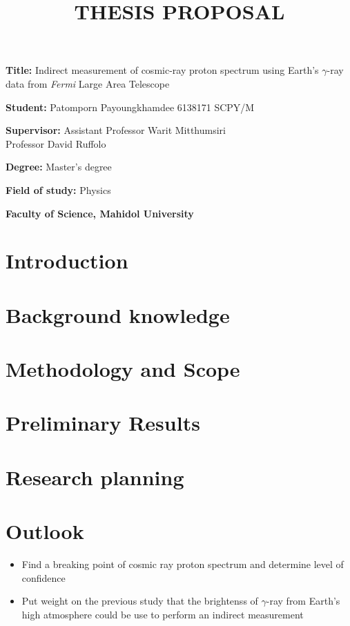 \documentclass[12pt, a4paper]{article}
\title{THESIS PROPOSAL}
\author{}
\date{}
\newcommand{\namelistlabel}[1]{\mbox{#1}\hfil}
\newenvironment{namelist}[1]{%
\begin{list}{}
    {
        \let\makelabel\namelistlabel
        \settowidth{\labelwidth}{#1}
        \setlength{\leftmargin}{1.1\labelwidth}
    }
  }{%
\end{list}}
\begin{document}
\maketitle

\begin{namelist}{xxxxxxxxxxxx}
\item[{\bf Title:}]
Indirect measurement of cosmic-ray proton spectrum using Earth's $\gamma$-ray data from \textit{Fermi} Large Area Telescope
\item[{\bf Student:}]
	Patomporn Payoungkhamdee 6138171 SCPY/M
\item[{\bf Supervisor:}]
  Assistant Professor Warit Mitthumsiri \\
  Professor David Ruffolo
\item[{\bf Degree:}]
	Master's degree
\item[{\bf Field of study:}]
	Physics
\item[{\bf Faculty of Science,  Mahidol University }]
\end{namelist}

\section{Introduction}


\section{Background knowledge}


\section{Methodology and Scope}


\section{Preliminary Results}


\newpage 
\section{Research planning}


\section{Outlook}
\begin{itemize}
  \item Find a breaking point of cosmic ray proton spectrum and determine level of confidence
  \item Put weight on the previous study that the brightenss of $\gamma$-ray from Earth's high atmosphere could be use to perform an indirect measurement
\end{itemize}



\end{document}
